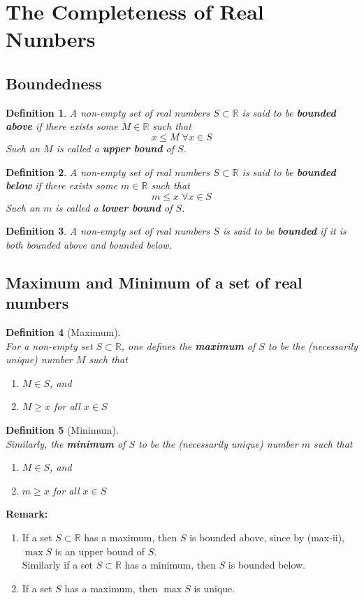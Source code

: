 \documentclass[8pt]{article}
\newtheorem{definition}{Definition}[section]
\theoremstyle{definition}
\begin{document}
\section{The Completeness of Real Numbers}
\subsection{Boundedness}
\begin{definition}\normalfont A non-empty set of real numbers $S\subset\mathbb{R}$ is said to be \textbf{bounded above} if there exists some $M\in\mathbb{R}$ such that
\[
x\leq M\;\forall x\in S
\]
Such an $M$ is called a \textbf{upper bound} of $S$.
\end{definition} 
\begin{definition}\normalfont A non-empty set of real numbers $S\subset\mathbb{R}$ is said to be \textbf{bounded below} if there exists some $m\in\mathbb{R}$ such that
\[
m\leq x\;\forall x\in S
\]
Such an $m$ is called a \textbf{lower bound} of $S$.
\end{definition}
\begin{definition}\normalfont A non-empty set of real numbers $S$ is said to be \textbf{bounded} if it is both bounded above and bounded below.
\end{definition}
\subsection{Maximum and Minimum of a set of real numbers}
\begin{definition}[Maximum]
\hfill\\\normalfont For a non-empty set $S\subset \mathbb{R}$, one defines the \textbf{maximum} of $S$ to be the (necessarily unique) number $M$ such that
\begin{enumerate}[label = max-\roman*]
\item $M\in S$, and 
\item $M\geq x$ for all $x\in S$
\end{enumerate}
\end{definition}
\begin{definition}[Minimum]
\hfill\\\normalfont Similarly, the \textbf{minimum} of $S$ to be the (necessarily unique) number $m$ such that
\begin{enumerate}[label = min-\roman*]
\item $M\in S$, and 
\item $m\geq x$ for all $x\in S$
\end{enumerate}
\end{definition}
\textbf{Remark:}
\begin{enumerate}
\item If a set $S\subset\mathbb{R}$ has a maximum, then $S$ is bounded above, since by (max-ii), $\max S$ is an upper bound of $S$.\\Similarly if a set $S\subset\mathbb{R}$ has a minimum, then $S$ is bounded below.
\item If a set $S$ has a maximum, then $\max S$ is unique.
\end{enumerate}
\end{document}
